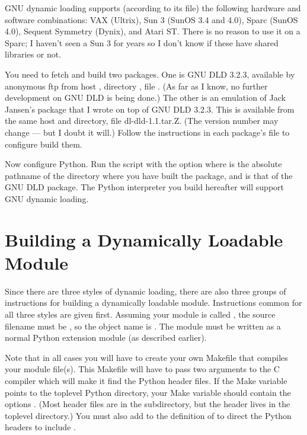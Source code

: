 GNU dynamic loading supports (according to its  file) the
following hardware and software combinations: VAX (Ultrix), Sun 3
(SunOS 3.4 and 4.0), Sparc (SunOS 4.0), Sequent Symmetry (Dynix), and
Atari ST.  There is no reason to use it on a Sparc; I haven't seen a
Sun 3 for years so I don't know if these have shared libraries or not.

You need to fetch and build two packages.  One is GNU DLD 3.2.3,
available by anonymous ftp from host , directory
, file .  (As far as I know,
no further development on GNU DLD is being done.)  The other is an
emulation of Jack Jansen's  package that I wrote on top of
GNU DLD 3.2.3.  This is available from the same host and directory,
file dl-dld-1.1.tar.Z.  (The version number may change --- but I doubt
it will.)  Follow the instructions in each package's 
file to configure build them.

Now configure Python.  Run the  script with the option
 where
 is the absolute pathname of the directory where you
have built the  package, and  is that
of the GNU DLD package.  The Python interpreter you build hereafter
will support GNU dynamic loading.


\section{Building a Dynamically Loadable Module}

Since there are three styles of dynamic loading, there are also three
groups of instructions for building a dynamically loadable module.
Instructions common for all three styles are given first.  Assuming
your module is called , the source filename must be
, so the object name is .  The
module must be written as a normal Python extension module (as
described earlier).

Note that in all cases you will have to create your own Makefile that
compiles your module file(s).  This Makefile will have to pass two
 arguments to the C compiler which will make it find the
Python header files.  If the Make variable  points to
the toplevel Python directory, your  Make variable should
contain the options .
(Most header files are in the  subdirectory, but the
 header lives in the toplevel directory.)  You must
also add  to the definition of  to
direct the Python headers to include .


